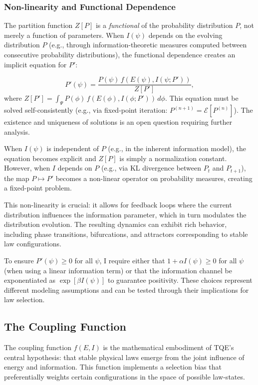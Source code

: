 \documentclass[12pt,a4paper]{article}
\theoremstyle{definition}
\theoremstyle{remark}
\begin{document}
\subsubsection{Non-linearity and Functional Dependence}

The partition function $Z[P]$ is a \emph{functional} of the probability distribution $P$, not merely a function of parameters. When $I(\psi)$ depends on the evolving distribution $P$ (e.g., through information-theoretic measures computed between consecutive probability distributions), the functional dependence creates an implicit equation for $P'$:

\begin{equation}
P'(\psi) = \frac{P(\psi) \, f(E(\psi), I(\psi; P'))}{Z[P']},
\end{equation}
where $Z[P'] = \int_\Psi P(\phi) \, f(E(\phi), I(\phi; P')) \, d\phi$. This equation must be solved self-consistently (e.g., via fixed-point iteration: $P^{(n+1)} = \mathcal{E}[P^{(n)}]$). The existence and uniqueness of solutions is an open question requiring further analysis.

When $I(\psi)$ is independent of $P$ (e.g., in the inherent information model), the equation becomes explicit and $Z[P]$ is simply a normalization constant. However, when $I$ depends on $P$ (e.g., via KL divergence between $P_t$ and $P_{t+1}$), the map $P \mapsto P'$ becomes a non-linear operator on probability measures, creating a fixed-point problem.

This non-linearity is crucial: it allows for feedback loops where the current distribution influences the information parameter, which in turn modulates the distribution evolution. The resulting dynamics can exhibit rich behavior, including phase transitions, bifurcations, and attractors corresponding to stable law configurations.

To ensure $P'(\psi) \geq 0$ for all $\psi$, I require either that $1 + \alpha I(\psi) \geq 0$ for all $\psi$ (when using a linear information term) or that the information channel be exponentiated as $\exp[\beta I(\psi)]$ to guarantee positivity. These choices represent different modeling assumptions and can be tested through their implications for law selection.

\subsection{The Coupling Function}

The coupling function $f(E,I)$ is the mathematical embodiment of TQE's central hypothesis: that stable physical laws emerge from the joint influence of energy and information. This function implements a selection bias that preferentially weights certain configurations in the space of possible law-states.
\end{document}
